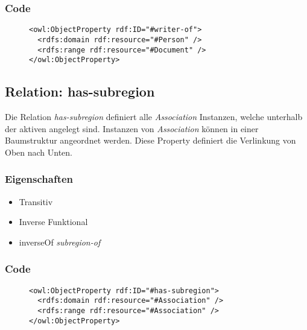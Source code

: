 \documentclass[
    11pt,
    latin1,
    a4paper,
    oneside
]{scrreprt}
\begin{document}
\subsubsection{Code} \label{sec:rel_writerof_code}

\begin{figure}[h]
 \lstset{language=XML}
 \begin{lstlisting}[label=owl:writerof,caption={Die Relation \emph{writer-of} gibt an, welche \emph{Person} an welchem \emph{Document} gearbeitet hat}]
<owl:ObjectProperty rdf:ID="#writer-of">
  <rdfs:domain rdf:resource="#Person" />
  <rdfs:range rdf:resource="#Document" />
</owl:ObjectProperty>
 \end{lstlisting}
\end{figure}


\subsection{Relation: has-subregion} \label{sec:rel_hassubregion}

Die Relation \emph{has-subregion} definiert alle \emph{Association} Instanzen, welche unterhalb der aktiven angelegt sind. Instanzen von \emph{Association} k\"onnen in einer Baumstruktur angeordnet werden. Diese Property definiert die Verlinkung von Oben nach Unten.

\subsubsection{Eigenschaften} \label{sec:rel_hassubregion_settings}

\begin{itemize}
  \item Transitiv
  \item Inverse Funktional
  \item inverseOf \emph{subregion-of}
\end{itemize}

\subsubsection{Code} \label{sec:rel_hassubregion_code}

\begin{figure}[h]
 \lstset{language=XML}
 \begin{lstlisting}[label=owl:hassubregion,caption={Die Relation \emph{has-subregion} definiert, welche Untersektionen eine \emph{Association} hat}]
<owl:ObjectProperty rdf:ID="#has-subregion">
  <rdfs:domain rdf:resource="#Association" />
  <rdfs:range rdf:resource="#Association" />
</owl:ObjectProperty>
 \end{lstlisting}
\end{figure}
\end{document}
